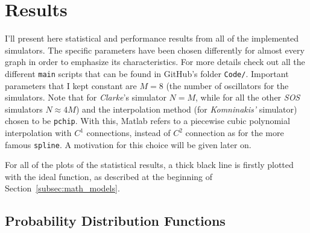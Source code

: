 \section{Results} %
\label{sec:results}

I'll present here statistical and performance results from all of the implemented simulators. The specific parameters have been chosen differently for almost every graph in order to emphasize its characteristics. For more details check out all the different \texttt{main} scripts that can be found in GitHub's folder \texttt{Code/}. Important parameters that I kept constant are $M=8$ (the number of oscillators for the simulators. Note that for \textit{Clarke}'s simulator $N=M$, while for all the other \textit{SOS} simulators $N \approx 4M$) and the interpolation method (for \textit{Komninakis'} simulator) chosen to be \texttt{pchip}. With this, Matlab refers to a piecewise cubic polynomial interpolation with $C^1$ connections, instead of $C^2$ connection as for the more famous \texttt{spline}. A motivation for this choice will be given later on.

For all of the plots of the statistical results, a thick black line is firstly plotted with the ideal function, as described at the beginning of Section~\ref{subsec:math_models}.

\subsection{Probability Distribution Functions}

